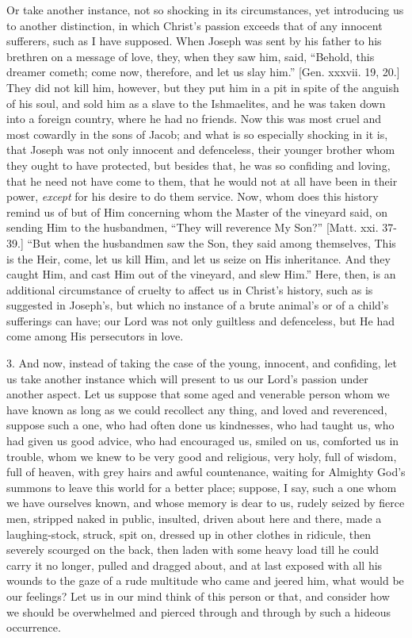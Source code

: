 Or take another instance, not so shocking in its circumstances, yet
introducing us to another distinction, in which Christ's passion
exceeds that of any innocent sufferers, such as I have supposed. When
Joseph was sent by his father to his brethren on a message of love,
they, when they saw him, said, ``Behold, this dreamer cometh; come
now, therefore, and let us slay him.'' [Gen. xxxvii. 19, 20.] They
did not kill him, however, but they put him in a pit in spite of the
anguish of his soul, and sold him as a slave to the Ishmaelites, and
he was taken down into a foreign country, where he had no friends. Now
this was most cruel and most cowardly in the sons of Jacob; and what
is so especially shocking in it is, that Joseph was not only innocent
and defenceless, their younger brother whom they ought to have
protected, but besides that, he was so confiding and loving, that he
need not have come to them, that he would not at all have been in
their power, \emph{except} for his desire to do them service. Now,
whom does this history remind us of but of Him concerning whom the
Master of the vineyard said, on sending Him to the husbandmen,
``They will reverence My Son?'' [Matt. xxi. 37-39.] ``But
when the husbandmen saw the Son, they said among themselves, This is
the Heir, come, let us kill Him, and let us seize on His inheritance.
And they caught Him, and cast Him out of the vineyard, and slew
Him.'' Here, then, is an additional circumstance of cruelty to
affect us in Christ's history, such as is suggested in Joseph's, but
which no instance of a brute animal's or of a child's sufferings can
have; our Lord was not only guiltless and defenceless, but He had come
among His persecutors in love.

3. And now, instead of taking the case of the young, innocent, and
confiding, let us take another instance which will present to us our
Lord's passion under another aspect. Let us suppose that some aged and
venerable person whom we have known as long as we could recollect any
thing, and loved and reverenced, suppose such a one, who had often
done us kindnesses, who had taught us, who had given us good advice,
who had encouraged us, smiled on us, comforted us in trouble, whom we
knew to be very good and religious, very holy, full of wisdom, full of
heaven, with grey hairs and awful countenance, waiting for Almighty
God's summons to leave this world for a better place; suppose, I say,
such a one whom we have ourselves known, and whose memory is dear to
us, rudely seized by fierce men, stripped naked in public, insulted,
driven about here and there, made a laughing-stock, struck, spit on,
dressed up in other clothes in ridicule, then severely scourged on the
back, then laden with some heavy load till he could carry it no
longer, pulled and dragged about, and at last exposed with all his
wounds to the gaze of a rude multitude who came and jeered him, what
would be our feelings? Let us in our mind think of this person or
that, and consider how we should be overwhelmed and pierced through
and through by such a hideous occurrence.

